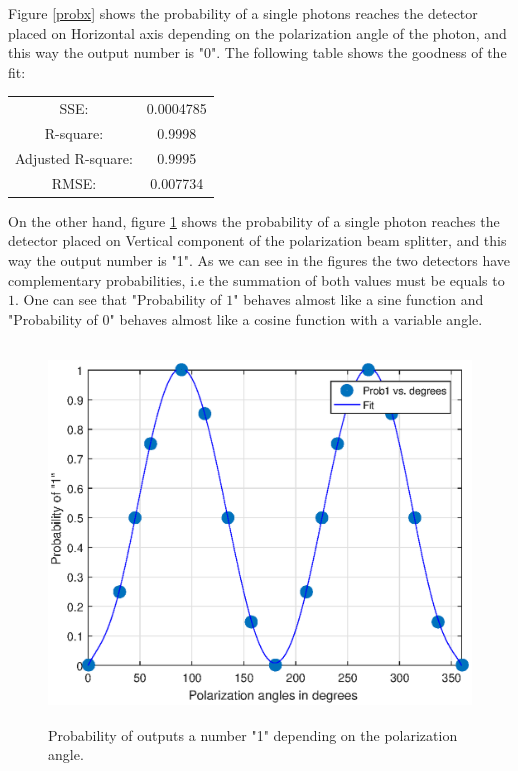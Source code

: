 Figure \ref{probx} shows the probability of a single photons reaches the detector placed on Horizontal axis depending on the polarization angle of the photon, and this way the output number is "0". The following table shows the goodness of the fit:
\begin{table}[H]
\centering
\label{tab:goodnessfitprob0}
    \begin{tabular}{c|c}
      SSE:                  & 0.0004785\\
      R-square:             &0.9998\\
      Adjusted R-square:    &0.9995\\
      RMSE:                 &0.007734
  \end{tabular}
\end{table}

On the other hand, figure \ref{proby} shows the probability of a single photon reaches the detector placed on Vertical component of the polarization beam splitter, and this way the output number is "1". As we can see in the figures the two detectors have complementary probabilities, i.e the summation of both values must be equals to $1$. One can see that "Probability of $1$" \space behaves almost like a sine function and "Probability of 0" \space behaves almost like a cosine function with a variable angle.

\begin{figure}[H]
    \centering
        \includegraphics[width=15cm,height=10cm]{./sdf/quantum_random_number_generator/figures/prob1.eps}
    \caption{Probability of outputs a number "1" \space depending on the polarization angle.}\label{proby}
\end{figure}

